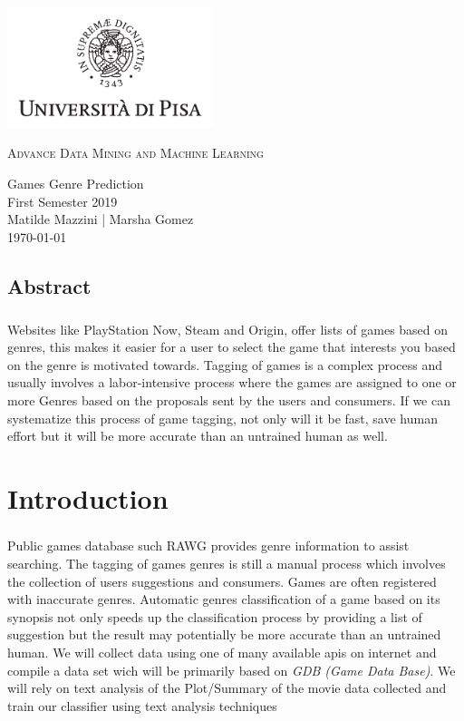 \documentclass{book}
\author{Matilde Mazzini | Marsha Gomez Gomez}
\begin{document}
\begin{titlepage}
    \centering
    \includegraphics[width=6cm]{unipi}
    \vfill
    \vspace{1.5cm}
    {\huge\textsc{Advance Data Mining and Machine Learning}\par}
    {\Large
        Games Genre Prediction\\
        First Semester 2019\\
        \vskip2cm
        Matilde Mazzini | Marsha Gomez\\
        \vskip2cm
        \today
    }    
    \vfill
    \vfill
\end{titlepage}
    \tableofcontents
    
    
    \section*{Abstract}
    \paragraph{}
    Websites like PlayStation Now, Steam and Origin, offer lists of games based on genres, this makes it easier for a user to select the game that interests you based on the genre is motivated towards. Tagging of games is a complex process and usually involves a labor-intensive process where the games are assigned to one or more Genres based on the proposals sent by the users and consumers. If we can systematize this process of game tagging, not only will it be fast, save human effort but it will be more accurate than an untrained human as well.

    \chapter{Introduction}
    \paragraph{}
    Public games database such RAWG provides genre information to assist searching. The tagging of games genres is still a manual process which involves the collection of users suggestions and consumers. Games are often registered with inaccurate genres. Automatic genres classification of a game based on its synopsis not only speeds up the classification process by providing a list of suggestion but the result may potentially be more accurate than an untrained human. We will collect data using one of many available apis on internet and compile a data set wich will be primarily based on \textit{GDB (Game Data Base)}. We will rely on text analysis of the Plot/Summary of the movie data collected and train our classifier using text analysis techniques
\end{document}
